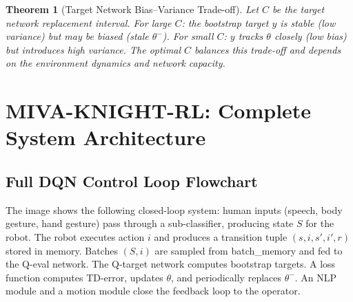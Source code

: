 \documentclass[12pt,a4paper]{article}
\theoremstyle{definition}
\theoremstyle{plain}
\newtheorem{theorem}{Theorem}[section]
\theoremstyle{remark}
\begin{document}
\begin{theorem}[Target Network Bias--Variance Trade-off]
\label{thm:target}
Let $C$ be the target network replacement interval. For large $C$: the bootstrap target $y$ is stable (low variance) but may be biased (stale $\theta^-$). For small $C$: $y$ tracks $\theta$ closely (low bias) but introduces high variance. The optimal $C$ balances this trade-off and depends on the environment dynamics and network capacity.
\end{theorem}

\newpage
\section{MIVA-KNIGHT-RL: Complete System Architecture}
\label{sec:system_arch}

\subsection{Full DQN Control Loop Flowchart}

The image shows the following closed-loop system: human inputs (speech, body gesture, hand gesture) pass through a sub-classifier, producing state $S$ for the robot. The robot executes action $i$ and produces a transition tuple $(s, i, s', i', r)$ stored in memory. Batches $(S, i)$ are sampled from batch\_memory and fed to the Q-eval network. The Q-target network computes bootstrap targets. A loss function computes TD-error, updates $\theta$, and periodically replaces $\theta^-$. An NLP module and a motion module close the feedback loop to the operator.
\end{document}
